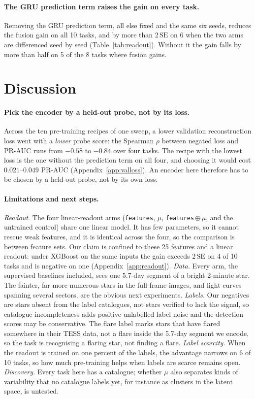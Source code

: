 \documentclass{article}
\begin{document}
\paragraph{The GRU prediction term raises the gain on every task.} Removing the
GRU prediction term, all else fixed and the same six
seeds, reduces the fusion gain on all 10 tasks, and by more than $2\,\mathrm{SE}$ on 6 when the two
arms are differenced seed by seed (Table~\ref{tab:readout}). Without it the gain falls by more
than half on 5 of the 8 tasks where fusion gains.

\section{Discussion}

\paragraph{Pick the encoder by a held-out probe, not by its loss.} Across the ten pre-training recipes of
one sweep, a lower validation reconstruction loss went with a \emph{lower} probe score: the Spearman
$\rho$ between negated loss and PR-AUC runs from $-0.58$ to $-0.84$ over four tasks. The recipe with the
lowest loss is the one without the prediction term on all four, and choosing it would cost
$0.021$--$0.049$ PR-AUC (Appendix~\ref{app:valloss}). An encoder here therefore has to be
chosen by a held-out probe, not by its own loss.

\paragraph{\textbf{Limitations and next steps.}} \emph{Readout.} The four linear-readout arms (\texttt{features},
$\mu$, \texttt{features}\,$\oplus\,\mu$, and the untrained control) share one linear model. It has few
parameters, so it cannot rescue weak features, and it is identical across the four, so the comparison
is between feature sets. Our claim is confined to these 25 features and a linear readout: under
XGBoost on the same inputs the gain exceeds $2\,\mathrm{SE}$ on 4 of 10 tasks and is negative on one
(Appendix~\ref{app:readout}). \emph{Data.} Every arm,
the supervised baselines included, sees one 5.7-day segment of a bright 2-minute star. The fainter,
far more numerous stars in the full-frame images, and light curves spanning several sectors, are the
obvious next experiments. \emph{Labels.} Our
negatives are stars absent from the label catalogues, not stars verified to lack the signal, so
catalogue incompleteness adds positive-unlabelled label noise and the detection scores may be
conservative. The flare label marks stars that have flared somewhere in their TESS data, not a flare inside
the 5.7-day segment we encode, so the task is recognising a flaring star, not finding a flare. \emph{Label scarcity.} When
the readout is trained on one percent of the labels, the advantage narrows on 6 of 10 tasks, so how
much pre-training helps when labels are scarce remains open. \emph{Discovery.} Every task here has a
catalogue; whether $\mu$ also separates kinds of variability that no catalogue labels yet, for instance
as clusters in the latent space, is untested.
\end{document}
